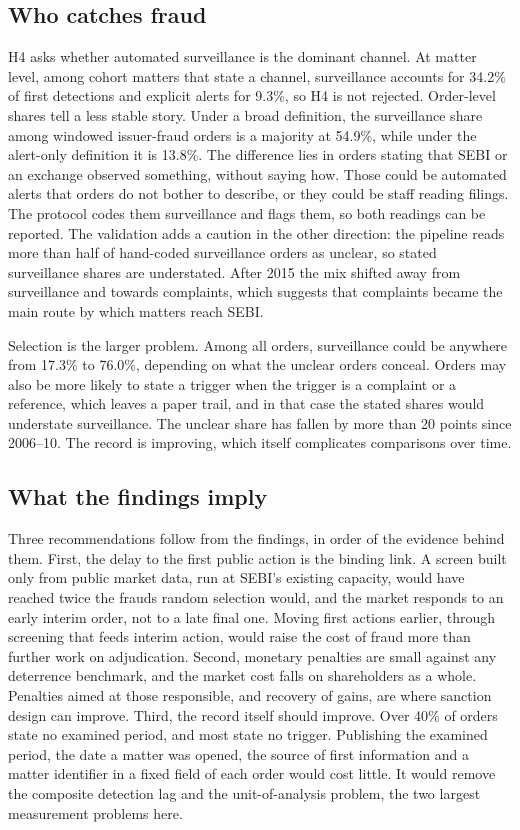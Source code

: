 \documentclass[letterpaper,11pt,leqno]{article}
\begin{document}
\subsection{Who catches fraud}

H4 asks whether automated surveillance is the dominant channel. At matter level, among cohort matters that state a channel, surveillance accounts for 34.2\% of first detections and explicit alerts for 9.3\%, so H4 is not rejected. Order-level shares tell a less stable story. Under a broad definition, the surveillance share among windowed issuer-fraud orders is a majority at 54.9\%, while under the alert-only definition it is 13.8\%. The difference lies in orders stating that SEBI or an exchange observed something, without saying how. Those could be automated alerts that orders do not bother to describe, or they could be staff reading filings. The protocol codes them surveillance and flags them, so both readings can be reported. The validation adds a caution in the other direction: the pipeline reads more than half of hand-coded surveillance orders as unclear, so stated surveillance shares are understated. After 2015 the mix shifted away from surveillance and towards complaints, which suggests that complaints became the main route by which matters reach SEBI.

Selection is the larger problem. Among all orders, surveillance could be anywhere from 17.3\% to 76.0\%, depending on what the unclear orders conceal. Orders may also be more likely to state a trigger when the trigger is a complaint or a reference, which leaves a paper trail, and in that case the stated shares would understate surveillance. The unclear share has fallen by more than 20 points since 2006--10. The record is improving, which itself complicates comparisons over time.

\subsection{What the findings imply}

Three recommendations follow from the findings, in order of the evidence behind them. First, the delay to the first public action is the binding link. A screen built only from public market data, run at SEBI's existing capacity, would have reached twice the frauds random selection would, and the market responds to an early interim order, not to a late final one. Moving first actions earlier, through screening that feeds interim action, would raise the cost of fraud more than further work on adjudication. Second, monetary penalties are small against any deterrence benchmark, and the market cost falls on shareholders as a whole. Penalties aimed at those responsible, and recovery of gains, are where sanction design can improve. Third, the record itself should improve. Over 40\% of orders state no examined period, and most state no trigger. Publishing the examined period, the date a matter was opened, the source of first information and a matter identifier in a fixed field of each order would cost little. It would remove the composite detection lag and the unit-of-analysis problem, the two largest measurement problems here.
\end{document}
